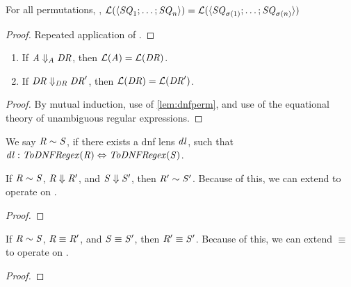 \begin{lemma}
\label{lem:dnfperm}
For all permutations, \Permutation{},
$\mathcal{L}(\langle\mathit{SQ}_1;\ldots;\mathit{SQ}_n\rangle)=
\mathcal{L}(\langle\mathit{SQ}_{\sigma(1)};\ldots;
\mathit{SQ}_{\sigma(n)}\rangle)$
\end{lemma}
\begin{proof}
Repeated application of \OrCommutativityRule{}.
\end{proof}

\begin{lemma}\leavevmode
\label{lem:language-rewrite-safe}
\begin{enumerate}
\item If $\mathit{A}\Downarrow_{\mathit{A}}\mathit{DR}$, then
$\mathcal{L}(\mathit{A})=\mathcal{L}(\mathit{DR})$.
\item If $\mathit{DR}\Downarrow_{\mathit{DR}}\mathit{DR}'$, then
$\mathcal{L}(\mathit{DR})=\mathcal{L}(\mathit{DR}')$.
\end{enumerate}
\end{lemma}
\begin{proof}
By mutual induction, use of \ref{lem:dnfperm}, and use of the equational
theory of unambiguous regular expressions.
\end{proof}

\begin{definition}
We say $\mathit{R}\sim\mathit{S}$, if there exists a dnf lens $\mathit{dl}$, such that
$\mathit{dl} : \mathit{ToDNFRegex}(\mathit{R}) \Leftrightarrow \mathit{ToDNFRegex}(\mathit{S})$.
\end{definition}

\begin{lemma}
\label{lem:rewrite-respect}
If $\mathit{R}\sim\mathit{S}$, $\mathit{R}\Downarrow\mathit{R}'$, and
$\mathit{S}\Downarrow\mathit{S}'$, then $\mathit{R}'\sim\mathit{S}'$.
Because of this, we can extend \Rewrite{} to operate on \EquivRegexType{}.
\end{lemma}
\begin{proof}
\end{proof}

\begin{lemma}
If $\mathit{R}\sim\mathit{S}$, $\mathit{R}\equiv\mathit{R}'$, and
$\mathit{S}\equiv\mathit{S}'$, then $\mathit{R}'\equiv\mathit{S}'$.
Because of this, we can extend $\equiv{}$ to operate on \EquivRegexType{}.
\end{lemma}
\begin{proof}
\end{proof}

